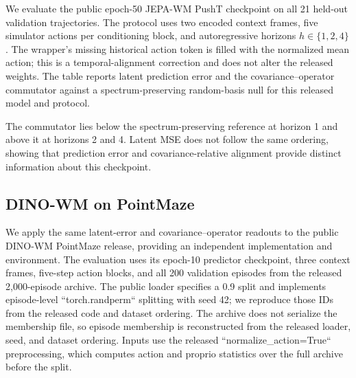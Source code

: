 \documentclass{article}
\begin{document}
We evaluate the public epoch-50 JEPA-WM PushT checkpoint on all 21
held-out validation trajectories. The protocol uses two encoded context frames,
five simulator actions per conditioning block, and autoregressive horizons
$h\in\{1,2,4\}$. The wrapper's missing historical action token is filled with
the normalized mean action; this is a temporal-alignment correction and does
not alter the released weights. The table reports latent prediction error and
the covariance--operator commutator against a spectrum-preserving random-basis
null for this released model and protocol.

\begin{table}[H]
\centering
\small
\setlength{\tabcolsep}{3pt}
\caption{JEPA-WM on held-out PushT trajectories. Results use the public validation split (21 trajectories), two-frame context, and five-action conditioning blocks.}
\label{tab:supp-jepa-wm-temporal}
\end{table}

The commutator lies below the spectrum-preserving reference at horizon 1 and
above it at horizons 2 and 4. Latent MSE does not follow the same ordering,
showing that prediction error and covariance-relative alignment provide
distinct information about this checkpoint.

\subsection{DINO-WM on PointMaze}
\label{sec:supp-dino-wm}

We apply the same latent-error and covariance--operator readouts to the public
DINO-WM PointMaze release, providing an independent implementation and environment.
The evaluation uses its epoch-10 predictor checkpoint, three
context frames, five-step action blocks, and all 200 validation episodes from
the released 2,000-episode archive. The public loader specifies a 0.9 split and
implements episode-level ``torch.randperm`` splitting with seed 42; we reproduce
those IDs from the released code and dataset ordering. The archive does not
serialize the membership file, so episode membership is reconstructed from the
released loader, seed, and dataset ordering. Inputs use the released ``normalize\_action=True``
preprocessing, which computes action and proprio statistics over the full
archive before the split.
\end{document}
